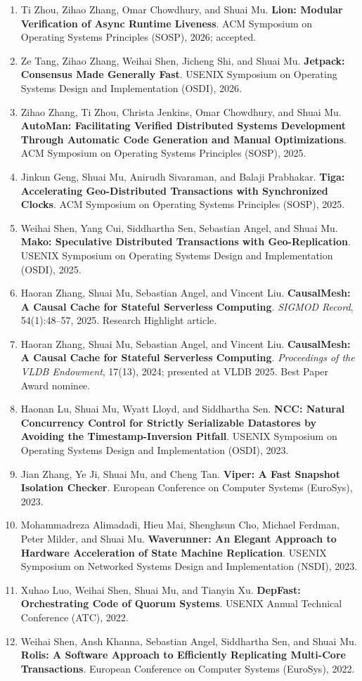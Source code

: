 \documentclass[10pt,letterpaper]{article}
\newcommand{\cvsection}[1]{\Needspace{4\baselineskip}\vspace{8pt}{\large\bfseries #1}\par\vspace{3pt}}
\newcommand{\pub}[3]{\item #1. \textbf{#2}. #3.}
\begin{document}
\newpage
\cvsection{Publications and Accepted Papers}
\begin{enumerate}
\pub{Ti Zhou, Zihao Zhang, Omar Chowdhury, and Shuai Mu}{Lion: Modular Verification of Async Runtime Liveness}{ACM Symposium on Operating Systems Principles (SOSP), 2026; accepted}
\pub{Ze Tang, Zihao Zhang, Weihai Shen, Jicheng Shi, and Shuai Mu}{Jetpack: Consensus Made Generally Fast}{USENIX Symposium on Operating Systems Design and Implementation (OSDI), 2026}
\pub{Zihao Zhang, Ti Zhou, Christa Jenkins, Omar Chowdhury, and Shuai Mu}{AutoMan: Facilitating Verified Distributed Systems Development Through Automatic Code Generation and Manual Optimizations}{ACM Symposium on Operating Systems Principles (SOSP), 2025}
\pub{Jinkun Geng, Shuai Mu, Anirudh Sivaraman, and Balaji Prabhakar}{Tiga: Accelerating Geo-Distributed Transactions with Synchronized Clocks}{ACM Symposium on Operating Systems Principles (SOSP), 2025}
\pub{Weihai Shen, Yang Cui, Siddhartha Sen, Sebastian Angel, and Shuai Mu}{Mako: Speculative Distributed Transactions with Geo-Replication}{USENIX Symposium on Operating Systems Design and Implementation (OSDI), 2025}
\pub{Haoran Zhang, Shuai Mu, Sebastian Angel, and Vincent Liu}{CausalMesh: A Causal Cache for Stateful Serverless Computing}{\emph{SIGMOD Record}, 54(1):48--57, 2025. Research Highlight article}
\pub{Haoran Zhang, Shuai Mu, Sebastian Angel, and Vincent Liu}{CausalMesh: A Causal Cache for Stateful Serverless Computing}{\emph{Proceedings of the VLDB Endowment}, 17(13), 2024; presented at VLDB 2025. Best Paper Award nominee}
\pub{Haonan Lu, Shuai Mu, Wyatt Lloyd, and Siddhartha Sen}{NCC: Natural Concurrency Control for Strictly Serializable Datastores by Avoiding the Timestamp-Inversion Pitfall}{USENIX Symposium on Operating Systems Design and Implementation (OSDI), 2023}
\pub{Jian Zhang, Ye Ji, Shuai Mu, and Cheng Tan}{Viper: A Fast Snapshot Isolation Checker}{European Conference on Computer Systems (EuroSys), 2023}
\pub{Mohammadreza Alimadadi, Hieu Mai, Shenghsun Cho, Michael Ferdman, Peter Milder, and Shuai Mu}{Waverunner: An Elegant Approach to Hardware Acceleration of State Machine Replication}{USENIX Symposium on Networked Systems Design and Implementation (NSDI), 2023}
\pub{Xuhao Luo, Weihai Shen, Shuai Mu, and Tianyin Xu}{DepFast: Orchestrating Code of Quorum Systems}{USENIX Annual Technical Conference (ATC), 2022}
\pub{Weihai Shen, Ansh Khanna, Sebastian Angel, Siddhartha Sen, and Shuai Mu}{Rolis: A Software Approach to Efficiently Replicating Multi-Core Transactions}{European Conference on Computer Systems (EuroSys), 2022}
\end{enumerate}
\end{document}
